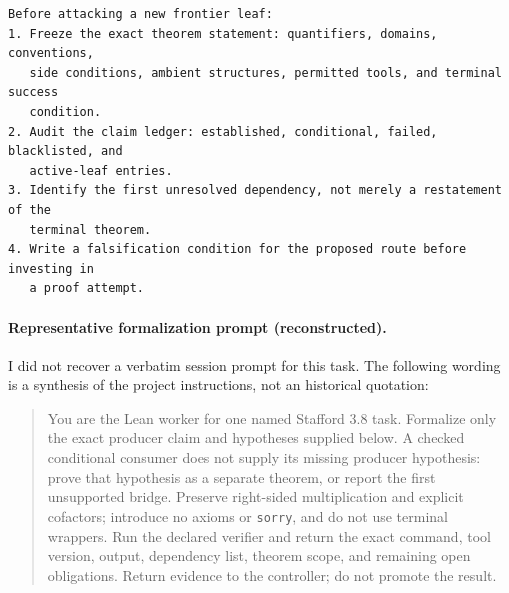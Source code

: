 \begin{verbatim}
Before attacking a new frontier leaf:
1. Freeze the exact theorem statement: quantifiers, domains, conventions,
   side conditions, ambient structures, permitted tools, and terminal success
   condition.
2. Audit the claim ledger: established, conditional, failed, blacklisted, and
   active-leaf entries.
3. Identify the first unresolved dependency, not merely a restatement of the
   terminal theorem.
4. Write a falsification condition for the proposed route before investing in
   a proof attempt.
\end{verbatim}

\paragraph{Representative formalization prompt (reconstructed).}
I did not recover a verbatim session prompt for this task. The
following wording is a synthesis of the project instructions, not an
historical quotation:

\begin{quote}\small
You are the Lean worker for one named Stafford 3.8 task. Formalize only the
exact producer claim and hypotheses supplied below. A checked conditional
consumer does not supply its missing producer hypothesis: prove that
hypothesis as a separate theorem, or report the first unsupported bridge.
Preserve right-sided multiplication and explicit cofactors; introduce no
axioms or \texttt{sorry}, and do not use terminal wrappers. Run the declared
verifier and return the exact command, tool version, output, dependency list,
theorem scope, and remaining open obligations. Return evidence to the
controller; do not promote the result.
\end{quote}
